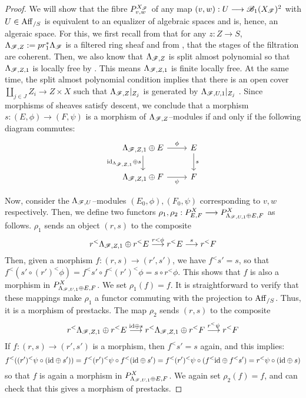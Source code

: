 \documentclass[11pt]{amsart}
\begin{document}
\begin{proof}
We will show that the fibre $P^{X_\mathscr{F}}_{v, w}$ of any map
$(v, w) : U \to \sB_1(X_\sF)^2$ with $U \in \mathrm{Aff}_{/S}$ is equivalent to an
equalizer of algebraic spaces and is, hence, an algeraic space. For this, we
first recall from \cite[\S 2]{ModRepFunGrpI} that for any
$z : Z \to S$, $\Lambda_{\mathscr{F}, Z} := pr_1^*\Lambda_{\mathscr{F}}$ is a filtered
ring sheaf and from \cite[Lemma 2.2]{ModRepFunGrpI}, that the stages of the
filtration are coherent. Then, we also know that $\Lambda_{\mathscr{F}, Z}$ is
split almost polynomial \cite[\S 3.3, \S 5.1]{GeomNonAbHodgeFilt} so that
$\Lambda_{\mathscr{F}, Z, 1}$ is locally free by
\cite[Theorem 2.11]{ModRepFunGrpI}.
This means $\Lambda_{\mathscr{F}, Z, 1}$ is finite locally free.
At the same time, the split almost polynomial condition implies that
there is an open cover $\coprod_{j \in J} Z_i \to Z \times X$ such that
$\Lambda_{\mathscr{F}, Z}|_{Z_j}$ is generated by $\Lambda_{\mathscr{F}, U, 1}|_{Z_j}$
\cite[Proof of Theorem 2.11]{ModRepFunGrpI}. Since morphisms of sheaves
satisfy descent, we conclude that a morphism $s : (E, \phi) \to (F, \psi)$
is a morphism of $\Lambda_{\mathscr{F}, Z}$--modules if and only if the following
diagram commutes:
\[\begin{tikzcd}
\Lambda_{\sF, Z, 1} \oplus E
\ar[r, "\phi"] \ar[d, "\id_{\Lambda_{\sF, Z, 1}} \oplus s" left] &
E \ar[d, "s"] \\
\Lambda_{\sF, Z, 1} \oplus F \ar[r, "\psi" below] & F
\end{tikzcd}\]

Now, consider the $\Lambda_{\mathscr{F}, U}$--modules $(E_0, \phi), (F_0, \psi)$
corresponding to $v, w$ respectively. Then, we define two functors
$\rho_1, \rho_2 : P^X_{E, F} \to P^X_{\Lambda_{\sF, U, 1} \oplus E, F}$
as follows. $\rho_1$ sends an object $(r, s)$ to the composite
\[
r^<\Lambda_{\sF, Z, 1} \oplus r^<E \to[r<\phi] r^<E \to[s] r^<F
\]
Then, given a morphism $f : (r, s) \to (r', s')$, we have $f^<s' = s$, so that
$f^<(s' \circ (r')^<\phi) = f^<s' \circ f^<(r')^<\phi = s \circ r^<\phi$. This
shows that $f$ is also a morphism in $P^X_{\Lambda_{\mathscr{F}, U, 1} \oplus E, F}$.
We set $\rho_1(f) = f$.
It is straightforward to verify that these mappings make $\rho_1$ a functor
commuting with the projection to $\mathrm{Aff}_{/S}$. Thus, it is a morphism of
prestacks.
The map $\rho_2$ sends $(r, s)$ to the composite
\[
r^<\Lambda_{\sF, Z, 1} \oplus r^<E \to[\id \oplus s]
r^<\Lambda_{\sF, Z, 1} \oplus r^<F \to[r^<\psi]
r^<F
\]
If $f : (r, s) \to (r', s')$ is a morphism, then $f^<s' = s$ again, and this
implies:
\[
f^<((r')^<\psi \circ (\mathrm{id} \oplus s'))
= f^<(r')^<\psi \circ f^<(\mathrm{id} \oplus s')
= f^<(r')^<\psi \circ (f^<\mathrm{id} \oplus f^<s')
= r^<\psi \circ (\mathrm{id} \oplus s)
\]
so that $f$ is again a morphism in $P^X_{\Lambda_{\mathscr{F}, U, 1} \oplus E, F}$.
We again set $\rho_2(f) = f$, and can check that this gives a morphism of
prestacks.


\end{proof}
\end{document}
